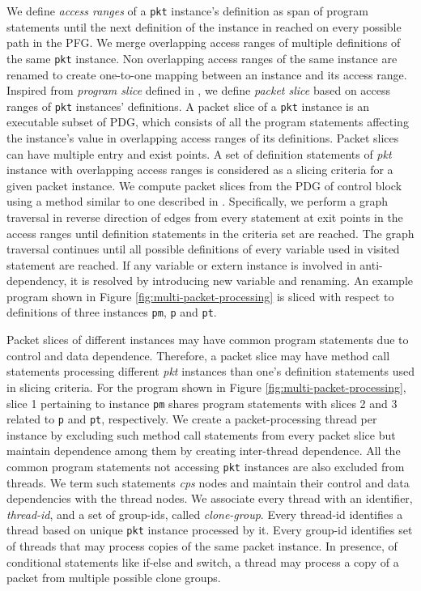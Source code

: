 We define \emph{access ranges} of a \texttt{pkt} instance's definition as span of program statements until the next definition of the instance in reached on every possible path in the PFG.
We merge overlapping access ranges of multiple definitions of the same \texttt{pkt} instance.
Non overlapping access ranges of the same instance are renamed to create one-to-one mapping between an instance and its access range.
Inspired from \emph{program slice} defined in \cite{Weiser:1981:PS:800078.802557}, we define \emph{packet slice} based on access ranges of \texttt{pkt} instances' definitions.
A packet slice of a \texttt{pkt} instance is an executable subset of PDG, which consists of all the program statements affecting the instance's value in overlapping access ranges of its definitions.
Packet slices can have multiple entry and exist points.
A set of definition statements of \emph{pkt} instance with overlapping access ranges is considered as a slicing criteria for a given packet instance.
We compute packet slices from the PDG of control block using a method similar to one described in \cite{Ferrante:1987:PDG:24039.24041}.
Specifically, we perform a graph traversal in reverse direction of edges from every statement at exit points in the access ranges until definition statements in the criteria set are reached.
The graph traversal continues until all possible definitions of every variable used in visited statement are reached.
If any variable or extern instance is involved in anti-dependency, it is resolved by introducing new variable and renaming.
An example program shown in Figure \ref{fig:multi-packet-processing} is sliced with respect to definitions of three instances \texttt{pm}, \texttt{p} and \texttt{pt}.


Packet slices of different instances may have common program statements due to control and data dependence.
Therefore, a packet slice may have method call statements processing different \emph{pkt} instances than one's definition statements used in slicing criteria.
For the program shown in Figure \ref{fig:multi-packet-processing}, slice 1 pertaining to instance \texttt{pm} shares program statements with slices 2 and 3 related to \texttt{p} and \texttt{pt}, respectively.
We create a packet-processing thread per instance by excluding such method call statements from every packet slice but maintain dependence among them by creating inter-thread dependence.
All the common program statements not accessing \texttt{pkt} instances are also excluded from threads.
We term such statements \emph{cps} nodes and maintain their control and data dependencies with the thread nodes.
We associate every thread with an identifier, \emph{thread-id}, and a set of group-ids, called \emph{clone-group}.
Every thread-id identifies a thread based on unique \texttt{pkt} instance processed by it.
Every group-id identifies set of threads that may process copies of the same packet instance.
In presence, of conditional statements like if-else and switch, a thread may process a copy of a packet from multiple possible clone groups.

